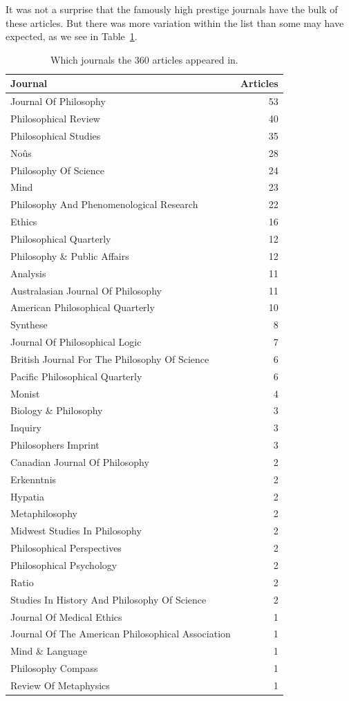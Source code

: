 \documentclass[
  10pt,
  letterpaper,
  DIV=11,
  numbers=noendperiod,
  twoside]{scrartcl}
\begin{document}
It was not a surprise that the famously high prestige journals have the
bulk of these articles. But there was more variation within the list
than some may have expected, as we see in
Table~\ref{tbl-journals-in-main-bib}.

\begin{longtable}[]{@{}lr@{}}

\caption{\label{tbl-journals-in-main-bib}Which journals the 360 articles
appeared in.}

\tabularnewline

\toprule\noalign{}
Journal & Articles \\
\midrule\noalign{}
\endhead
\bottomrule\noalign{}
\endlastfoot
Journal Of Philosophy & 53 \\
Philosophical Review & 40 \\
Philosophical Studies & 35 \\
Noûs & 28 \\
Philosophy Of Science & 24 \\
Mind & 23 \\
Philosophy And Phenomenological Research & 22 \\
Ethics & 16 \\
Philosophical Quarterly & 12 \\
Philosophy \& Public Affairs & 12 \\
Analysis & 11 \\
Australasian Journal Of Philosophy & 11 \\
American Philosophical Quarterly & 10 \\
Synthese & 8 \\
Journal Of Philosophical Logic & 7 \\
British Journal For The Philosophy Of Science & 6 \\
Pacific Philosophical Quarterly & 6 \\
Monist & 4 \\
Biology \& Philosophy & 3 \\
Inquiry & 3 \\
Philosophers Imprint & 3 \\
Canadian Journal Of Philosophy & 2 \\
Erkenntnis & 2 \\
Hypatia & 2 \\
Metaphilosophy & 2 \\
Midwest Studies In Philosophy & 2 \\
Philosophical Perspectives & 2 \\
Philosophical Psychology & 2 \\
Ratio & 2 \\
Studies In History And Philosophy Of Science & 2 \\
Journal Of Medical Ethics & 1 \\
Journal Of The American Philosophical Association & 1 \\
Mind \& Language & 1 \\
Philosophy Compass & 1 \\
Review Of Metaphysics & 1 \\

\end{longtable}
\end{document}
